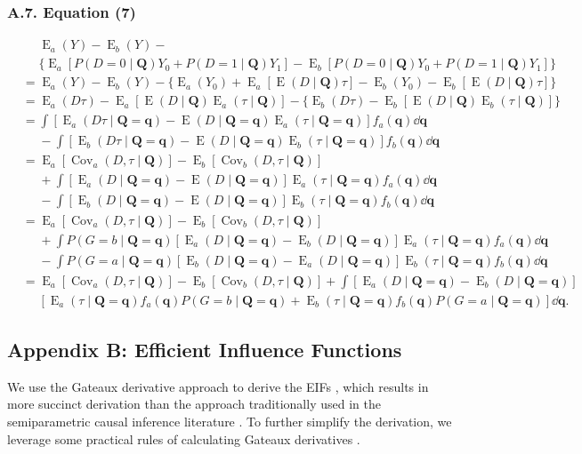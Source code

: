 \documentclass[12pt,a4paper]{article}
\newcommand{\Cov}{\operatorname{Cov}}
\newcommand{\E}{\operatorname{E}}
\def\Q{{\boldsymbol Q}}
\def\q{{\boldsymbol q}}
\begin{document}
\subsubsection*{A.7. Equation (7)}
\begin{align*}
&\phantom{{}={}} \E_a(Y)-\E_b(Y) - \\ 
&\phantom{{}={}} \lbrace \E_a[P(D=0 \mid \Q) Y_0 + P(D=1 \mid \Q) Y_1] - \E_b[P(D=0 \mid \Q) Y_0 + P(D=1 \mid \Q) Y_1] \rbrace \\
&= \E_a(Y)-\E_b(Y) - \lbrace \E_a(Y_0) + \E_a[\E(D \mid \Q) \tau] - \E_b(Y_0) - \E_b[\E(D \mid \Q) \tau] \rbrace \\
&= \E_a(D\tau)-\E_a[\E(D \mid \Q) \E_a(\tau \mid \Q)] - \lbrace \E_b(D\tau)-\E_b[\E(D \mid \Q) \E_b(\tau \mid \Q)] \rbrace \\
&= \int [\E_a(D \tau \mid \Q=\q) - \E(D \mid \Q=\q) \E_a(\tau \mid \Q=\q)] f_a(\q) \dd \q\\
&\phantom{{}={}} -\int [\E_b(D \tau \mid \Q=\q) - \E(D \mid \Q=\q) \E_b(\tau \mid \Q=\q)] f_b(\q) \dd \q\\
&= \E_a[\Cov_a(D,\tau \mid \Q)] - \E_b[\Cov_b(D,\tau \mid \Q)] \\
&\phantom{{}={}} + \int [\E_a(D \mid \Q=\q) - \E(D \mid \Q=\q)] \E_a(\tau \mid \Q=\q) f_a(\q) \dd \q\\
&\phantom{{}={}} - \int [\E_b(D \mid \Q=\q) - \E(D \mid \Q=\q)] \E_b(\tau \mid \Q=\q) f_b(\q) \dd \q\\
&= \E_a[\Cov_a(D,\tau \mid \Q)] - \E_b[\Cov_b(D,\tau \mid \Q)] \\
&\phantom{{}={}} + \int P(G=b \mid \Q=\q) [\E_a(D \mid \Q=\q) - \E_b(D \mid \Q=\q)] \E_a(\tau \mid \Q=\q) f_a(\q) \dd \q\\
&\phantom{{}={}} - \int P(G=a \mid \Q=\q) [\E_b(D \mid \Q=\q) - \E_a(D \mid \Q=\q)] \E_b(\tau \mid \Q=\q) f_b(\q) \dd \q\\
&= \E_a[\Cov_a(D,\tau \mid \Q)] - \E_b[\Cov_b(D,\tau \mid \Q)] + \int [\E_a(D \mid \Q=\q) - \E_b(D \mid \Q=\q)] \\
&\phantom{{}={}} [\E_a(\tau \mid \Q=\q)f_a(\q)P(G=b \mid \Q=\q) + \E_b(\tau \mid \Q=\q)f_b(\q)P(G=a \mid \Q=\q)] \dd \q.
\end{align*}


\subsection*{Appendix B: Efficient Influence Functions}
We use the Gateaux derivative approach to derive the EIFs \citep{ichimura_influence_2022}, which results in more succinct derivation than the approach traditionally used in the semiparametric causal inference literature \citep[e.g.,][]{hahn_role_1998}. To further simplify the derivation, we leverage some practical rules of calculating Gateaux derivatives \citep{hines_demystifying_2022, kennedy_semiparametric_2022}.
\end{document}
